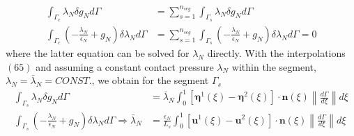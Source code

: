 \begin{equation}
\label{eqn:4.67}
\begin{aligned} \int_{\Gamma_{c}} \lambda_{N} \delta g_{N} d \Gamma &=\sum_{s=1}^{n_{s e g}} \int_{\Gamma_{s}} \lambda_{N} \delta g_{N} d \Gamma \\ \int_{\Gamma_{c}}\left(-\frac{\lambda_{N}}{\epsilon_{N}}+g_{N}\right) \delta \lambda_{N} d \Gamma &=\sum_{s=1}^{n_{s e g}} \int_{\Gamma_{s}}\left(-\frac{\lambda_{N}}{\epsilon_{N}}+g_{N}\right) \delta \lambda_{N} d \Gamma=0 \end{aligned} 
\end{equation}
where the latter equation can be solved for $ \lambda_{N} $ directly. With the interpolations $ (65) $ and assuming a constant contact pressure $ \lambda_{N} $ within the segment, $ \lambda_{N}=\bar{\lambda}_{N}=C O N S T . $, we obtain for the segment $ \Gamma_{s} $
\begin{equation}
\label{eqn:4.68}
\begin{aligned} \int_{\Gamma_{s}} \lambda_{N} \delta g_{N} d \Gamma &=\bar{\lambda}_{N} \int_{0}^{1}\left[\boldsymbol{\eta}^{1}(\xi)-\boldsymbol{\eta}^{2}(\xi)\right] \cdot \mathbf{n}(\xi)\left\|\frac{d \Gamma}{d \xi}\right\| d \xi \\ \int_{\Gamma_{s}}\left(-\frac{\lambda_{N}}{\epsilon_{N}}+g_{N}\right) \delta \lambda_{N} d \Gamma \Longrightarrow \bar{\lambda}_{N} &=\frac{\epsilon_{N}}{L_{s}} \int_{0}^{1}\left[\mathbf{u}^{1}(\xi)-\mathbf{u}^{2}(\xi)\right] \cdot \mathbf{n}(\xi)\left\|\frac{d \Gamma}{d \xi}\right\| d \xi \end{aligned}
\end{equation}